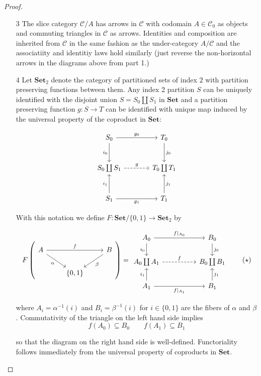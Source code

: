 \documentclass[11pt]{amsart}
\theoremstyle{plain}
\theoremstyle{definition}
\newcommand{\cC}{{\mathcal C}}
\newcommand{\Set}{{\mathbf{Set}}}
\newcommand{\noi}{{\noindent}}
\begin{document}
\begin{proof}
\begin{enumerate}
\item[3] The slice category $\cC/A$ has arrows in $\cC$ with codomain $A \in \cC_0$ as objects and commuting triangles in $\cC$ as arrows. Identities and composition are inherited from $\cC$ in the same fashion as the under-category $A/\cC$ and the associatiity and identitiy laws hold similarly (just reverse the non-horizontal arrows in the diagrams above from part 1.)\medskip 

\item[4] Let $\Set_2$ denote the category of partitioned sets of index $2$ with partition preserving functions between them. Any index 2 partition $S$ can be uniquely identified with the disjoint union $S = S_0 \coprod S_1$ in $\Set$ and a partition preserving function $g : S \to T$ can be identified with unique map induced by the universal property of the coproduct in $\Set$: 

\[ \begin{tikzcd}[column sep = large, row sep = large]
    S_0 \dar["i_0"']\rar["g_0"] & T_0 \dar["j_0"]\\
    S_0 \coprod S_1 \rar[dashed, "g"] & T_0 \coprod T_1 \\
    S_1 \uar["i_1"] \rar["g_1"'] & T_1 \uar["j_1"']
 \end{tikzcd} \]

\noi With this notation we define $F : \Set / \{0,1\} \to \Set_2$ by 

\[ \label{F2}F\left(\begin{tikzcd}
A \ar[dr, "\alpha"' ]\rar[rr,"f"]& & B \ar[dl, "\beta"]\\
&\{0,1\} & 
\end{tikzcd}\right) = 
\begin{tikzcd}[column sep = huge]
A_0 \dar["i_0"'] \rar["f|_{A_0}"] & B_0 \dar["j_0"]\\ 
A_0 \coprod A_1 \rar[dashed, "f"]  & B_0 \coprod B_1\\
A_1 \uar["i_1"] \rar["f|_{A_1}"'] & B_1 \uar["j_1"'] 
\end{tikzcd} \tag{$\star$}\]

\noi where $A_i = \alpha^{-1}(i)$ and $B_i = \beta^{-1}(i)$ for $i \in \{0,1\}$ are the fibers of $\alpha$ and $\beta$. Commutativity of the triangle on the left hand side implies
\[ f(A_0) \subseteq B_0 \qquad f(A_1) \subseteq B_1\]

\noi so that the diagram on the right hand side is well-defined. Functoriality follows immediately from the universal property of coproducts in $\Set$. \medskip 


\end{enumerate}
\end{proof}
\end{document}
